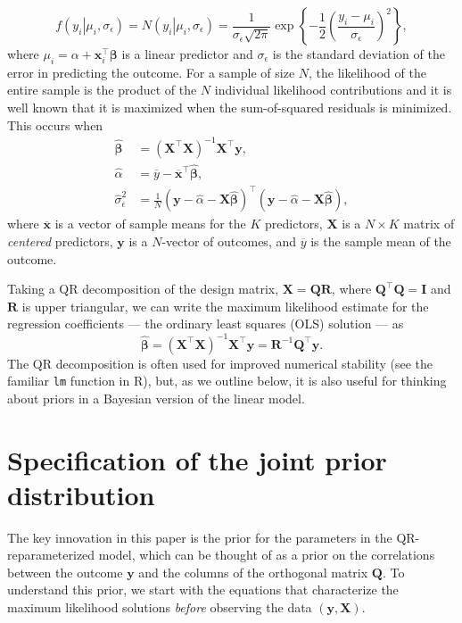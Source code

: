 \documentclass[11pt]{article}
\newcommand{\boldbeta}{\boldsymbol{\beta}}
\newcommand{\hatbeta}{\widehat{\boldbeta}}
\newcommand{\hatalpha}{\widehat{\alpha}}
\newcommand{\sigmaEps}{\sigma_{\epsilon}}
\newcommand{\X}{\mathbf{X}}
\newcommand{\y}{\mathbf{y}}
\newcommand{\Q}{\mathbf{Q}}
\newcommand{\R}{\mathbf{R}}
\newcommand{\given}{\left.\right|}
\begin{document}
$$
f \left(y_i \given \mu_i, \sigmaEps \right) =
N\left(y_i \given \mu_i, \sigmaEps \right) =
\frac{1}{\sigmaEps \sqrt{2 \pi}}
\exp{\left\{-\frac{1}{2} \left(\frac{y_i - \mu_i}{\sigmaEps}\right)^2\right\}},
$$
%
where $\mu_i = \alpha + \mathbf{x}_i^\top \boldbeta$ is a linear predictor and
$\sigmaEps$ is the standard deviation of the error in predicting the outcome.
For a sample of size $N$, the likelihood of the entire sample is the product of
the $N$ individual likelihood contributions and it is well known that it is
maximized when the sum-of-squared residuals is minimized. This occurs when
%
\begin{align*}
\hatbeta &= \left(\X^\top \X \right)^{-1} \X^\top \y,\\
\hatalpha &= \overline{y} - \overline{\mathbf{x}}^\top \hatbeta,\\
\widehat{\sigma}_{\epsilon}^2 &=
  \frac{1}{N}
  \left(\y - \hatalpha - \X \hatbeta \right)^\top
  \left(\y - \hatalpha - \X \hatbeta \right),
\end{align*}
%
where $\overline{\mathbf{x}}$ is a vector of sample means for the
$K$ predictors, $\X$ is a $N \times K$ matrix of \emph{centered} predictors,
$\y$ is a $N$-vector of outcomes, and $\overline{y}$ is the sample mean of the
outcome.

Taking a QR decomposition of the design matrix, $\X = \Q\R$, where $\Q^\top \Q =
\mathbf{I}$ and $\R$ is upper triangular, we can write the maximum likelihood
estimate for the regression coefficients --- the ordinary least squares (OLS)
solution --- as
$$\hatbeta = \left(\X^\top \X \right)^{-1} \X^\top \y = \R^{-1} \Q^\top \y.$$
%
The QR decomposition is often used for improved numerical stability (see the
familiar {\tt lm} function in R), but, as we outline below, it is also useful
for thinking about priors in a Bayesian version of the linear model.


\section{Specification of the joint prior distribution}
\label{sec:priors}

The key innovation in this paper is the prior for the parameters in the
QR-reparameterized model, which can be thought of as a prior on the correlations
between the outcome $\y$ and the columns of the orthogonal matrix $\Q$. To
understand this prior, we start with the equations that characterize the maximum
likelihood solutions \emph{before} observing the data $\left(\y, \X\right)$.
\end{document}

